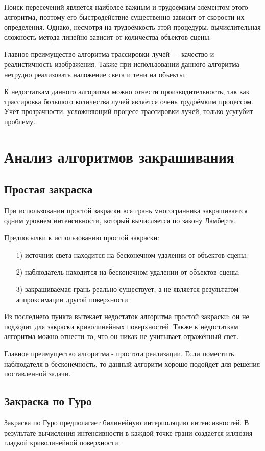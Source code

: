 Поиск пересечений является наиболее важным и трудоемким элементом этого алгоритма, поэтому его быстродействие существенно зависит от скорости их определения. Однако, несмотря на трудоёмкость этой процедуры, вычислительная сложность метода линейно зависит от количества объектов сцены. 

Главное преимущество алгоритма трассировки лучей --- качество и реалистичность изображения. Также при использовании данного алгоритма нетрудно реализовать наложение света и тени на объекты.

К недостаткам данного алгоритма можно отнести производительность, так как трассировка большого количества лучей является очень трудоёмким процессом. Учёт прозрачности, усложняющий процесс трассировки лучей, только усугубит проблему.

\section{Анализ алгоритмов закрашивания}
\subsection{Простая закраска}
При использовании простой закраски вся грань многогранника закрашивается одним уровнем интенсивности, который вычисляется по закону Ламберта.

Предпосылки к использованию простой закраски:
\begin{enumerate}
	\item[1)] источник света находится на бесконечном удалении от объектов сцены;
	\item[2)] наблюдатель находится на бесконечном удалении от объектов сцены;
	\item[3)] закрашиваемая грань реально существует, а не является результатом аппроксимации другой поверхности.
\end{enumerate}

Из последнего пункта вытекает недостаток алгоритма простой закраски: он не подходит для закраски криволинейных поверхностей. Также к недостаткам алгоритма можно отнести то, что он никак не учитывает отражённый свет.

Главное преимущество алгоритма - простота реализации. Если поместить наблюдателя в бесконечность, то данный алгоритм хорошо подойдёт для решения поставленной задачи.

\subsection{Закраска по Гуро}
Закраска по Гуро предполагает билинейную интерполяцию интенсивностей. В результате вычисления интенсивности в каждой точке грани создаётся иллюзия гладкой криволинейной поверхности.

